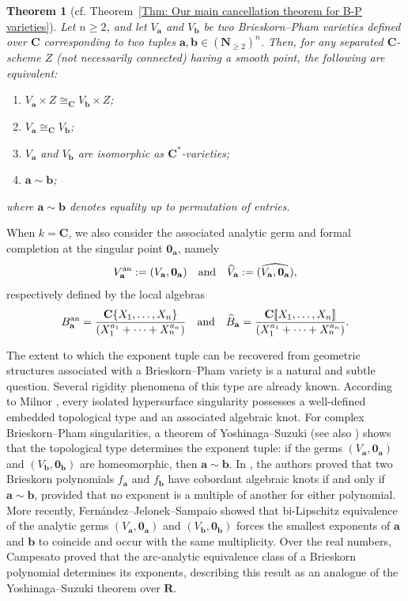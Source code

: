 \documentclass[english,10pt,reqno,twoside]{amsart}
\numberwithin{equation}{section}
\numberwithin{figure}{section}
\theoremstyle{plain}
\theoremstyle{plain}
\theoremstyle{definition}
\theoremstyle{plain}
\newtheorem{mainthm}{Theorem}
\numberwithin{equation}{section}
\newcommand{\C}{\mathbf{C}}
\newcommand{\N}{\mathbf{N}}
\newcommand{\oo}{\mathbf{0}}
\newcommand{\R}{\mathbf{R}}
\newcommand{\ba}{\mathbf{a}}
\newcommand{\bb}{\mathbf{b}}
\begin{document}
\begin{mainthm}[{cf. Theorem~\ref{Thm: Our main cancellation theorem for B-P varieties}}]\label{thm:mainB}
Let $n\geq 2$, and let $V_\ba$ and $V_\bb$ be two Brieskorn--Pham varieties defined over $\C$ corresponding to two tuples
$\ba,\bb\in(\N_{\geq 2})^n$.
Then, for any separated $\C$-scheme $Z$ (not necessarily connected) having a smooth point, the following are equivalent:
\begin{enumerate}[\indent\rm(1)]
    \item $V_\ba\times Z\cong_{\C} V_\bb\times Z$;
    \item $V_\ba\cong_{\C} V_\bb$;
    \item $V_\ba$ and $V_\bb$ are isomorphic as $\C^*$-varieties;
    \item $\ba \sim \bb$;
\end{enumerate}
where $\ba\sim\bb$ denotes equality up to permutation of entries.
\end{mainthm}

When $k=\C$, we also consider the associated analytic germ and formal completion at the singular point $\oo_{\ba}$, namely
\[
V^{\rm an}_\ba:=(V_\ba,\oo_\ba)
\quad \text{and} \quad
\widehat{V}_\ba:=\widehat{(V_\ba,\oo_\ba)},
\]
respectively defined by the local algebras
\[
B^{\rm an}_\ba
=
\frac{\C\{X_1,\ldots,X_n\}}{(X_1^{a_1}+\cdots+X_n^{a_n})}
\quad \text{and} \quad
\widehat{B}_\ba
=
\frac{\C[\![X_1,\ldots,X_n]\!]}{(X_1^{a_1}+\cdots+X_n^{a_n})}.
\]

The extent to which the exponent tuple can be recovered from geometric structures associated with a Brieskorn--Pham variety is a natural and subtle question. Several rigidity phenomena of this type are already known. According to Milnor \cite{Mil1968}, every isolated hypersurface singularity possesses a well-defined embedded topological type and an associated algebraic knot. For complex Brieskorn--Pham singularities, a theorem of Yoshinaga--Suzuki \cite{YS1978} (see also \cite[Corollary]{Yos1983}) shows that the topological type determines the exponent tuple: if the germs $(V_{\ba},\oo_{\ba})$ and $(V_{\bb},\oo_{\bb})$ are homeomorphic, then $\ba\sim\bb$. In \cite{BS2011}, the authors proved that two Brieskorn polynomials $f_\ba$ and $f_\bb$ have cobordant algebraic knots if and only if $\ba\sim\bb$, provided that no exponent is a multiple of another for either polynomial. More recently, Fern{\'a}ndez--Jelonek--Sampaio \cite{FJS2024_arxiv} showed that bi-Lipschitz equivalence of the analytic germs $(V_{\ba},\oo_{\ba})$ and $(V_{\bb},\oo_{\bb})$ forces the smallest exponents of $\ba$ and $\bb$ to coincide and occur with the same multiplicity. Over the real numbers, Campesato \cite{Cam2018} proved that the arc-analytic equivalence class of a Brieskorn polynomial determines its exponents, describing this result as an analogue of the Yoshinaga--Suzuki theorem over $\R$.
\end{document}

